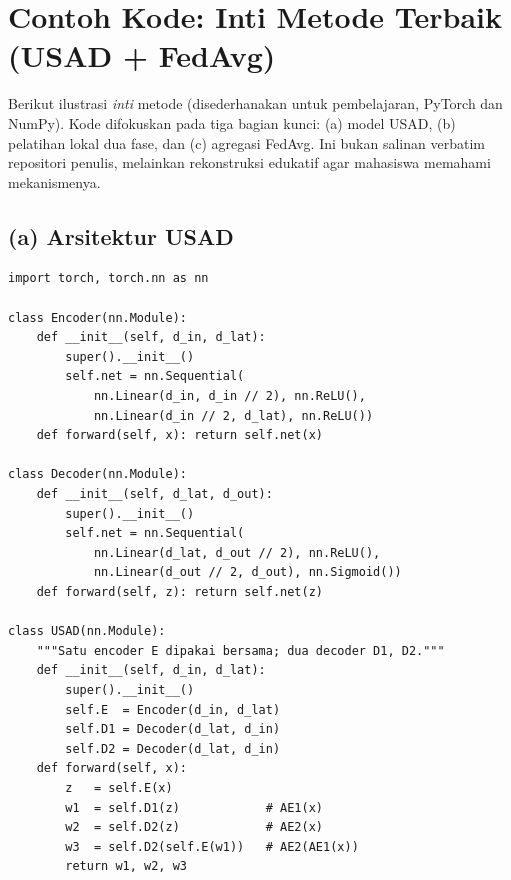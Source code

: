 \documentclass[11pt,a4paper]{article}
\begin{document}
\section{Contoh Kode: Inti Metode Terbaik (USAD + FedAvg)}

Berikut ilustrasi \emph{inti} metode (disederhanakan untuk pembelajaran, PyTorch
dan NumPy). Kode difokuskan pada tiga bagian kunci: (a) model USAD, (b)
pelatihan lokal dua fase, dan (c) agregasi FedAvg. Ini bukan salinan verbatim
repositori penulis, melainkan rekonstruksi edukatif agar mahasiswa memahami
mekanismenya.

\subsection{(a) Arsitektur USAD}
\begin{lstlisting}[style=py,caption={Encoder bersama + dua decoder (USAD).}]
import torch, torch.nn as nn

class Encoder(nn.Module):
    def __init__(self, d_in, d_lat):
        super().__init__()
        self.net = nn.Sequential(
            nn.Linear(d_in, d_in // 2), nn.ReLU(),
            nn.Linear(d_in // 2, d_lat), nn.ReLU())
    def forward(self, x): return self.net(x)

class Decoder(nn.Module):
    def __init__(self, d_lat, d_out):
        super().__init__()
        self.net = nn.Sequential(
            nn.Linear(d_lat, d_out // 2), nn.ReLU(),
            nn.Linear(d_out // 2, d_out), nn.Sigmoid())
    def forward(self, z): return self.net(z)

class USAD(nn.Module):
    """Satu encoder E dipakai bersama; dua decoder D1, D2."""
    def __init__(self, d_in, d_lat):
        super().__init__()
        self.E  = Encoder(d_in, d_lat)
        self.D1 = Decoder(d_lat, d_in)
        self.D2 = Decoder(d_lat, d_in)
    def forward(self, x):
        z   = self.E(x)
        w1  = self.D1(z)            # AE1(x)
        w2  = self.D2(z)            # AE2(x)
        w3  = self.D2(self.E(w1))   # AE2(AE1(x))
        return w1, w2, w3
\end{lstlisting}
\end{document}
